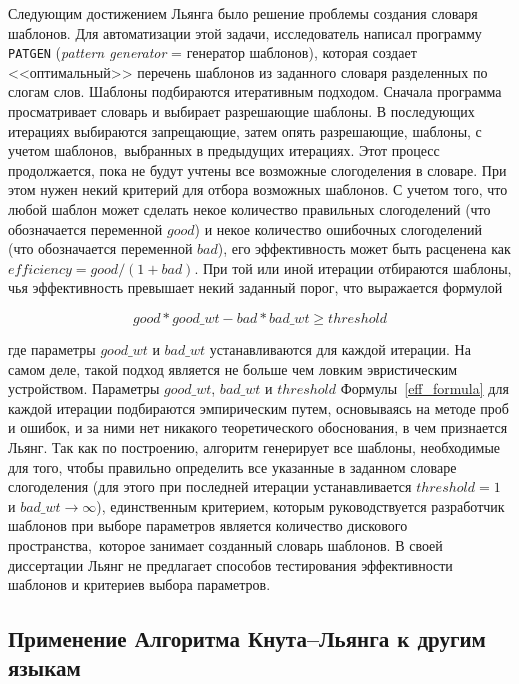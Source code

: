 \documentclass[12pt,a4paper,oneside]{extarticle}
\begin{document}
Следующим достижением Льянга было решение проблемы создания словаря шаблонов. Для автоматизации этой задачи, исследователь написал программу \verb+PATGEN+ (\emph{pattern generator} = генератор шаблонов), которая создает <<оптимальный>> перечень шаблонов из заданного словаря разделенных по слогам слов. Шаблоны подбираются итеративным подходом. Сначала программа просматривает словарь и выбирает разрешающие шаблоны. В последующих итерациях выбираются запрещающие, затем опять разрешающие, шаблоны, с учетом шаблонов, выбранных в предыдущих итерациях. Этот процесс продолжается, пока не будут учтены все возможные слогоделения в словаре. При этом нужен некий критерий для отбора возможных шаблонов. С учетом того, что любой шаблон может сделать некое количество правильных слогоделений (что обозначается переменной $good$) и некое количество ошибочных слогоделений (что обозначается переменной $bad$), его эффективность может быть расценена как $efficiency = good / (1 + bad)$. При той или иной итерации отбираются шаблоны, чья эффективность превышает некий заданный порог, что выражается формулой

\begin{equation}
\label{eff_formula}
good * good\_wt - bad * bad\_wt \geq threshold
\end{equation}

\noindent где параметры $good\_wt$ и $bad\_wt$ устанавливаются для каждой итерации. На самом деле, такой подход является не больше чем 
ловким эвристическим устройством. Параметры $good\_wt$, $bad\_wt$ и $threshold$ Формулы~\ref{eff_formula} для каждой итерации подбираются 
эмпирическим путем, основываясь на методе проб и ошибок, и за ними нет никакого теоретического обоснования, в чем признается 
Льянг\autocite[Ср.: <<We do not have any theoretical justification for these parameters; they just seem to work well>>.][p.~36]{liang1983}. 
Так как по построению, алгоритм генерирует все шаблоны, необходимые для того, чтобы правильно определить все указанные в заданном словаре 
слогоделения (для этого при последней итерации устанавливается $threshold = 1$ и $bad\_wt \rightarrow \infty$), единственным критерием, 
которым руководствуется разработчик шаблонов при выборе параметров является количество дискового пространства, которое занимает созданный 
словарь шаблонов. В своей диссертации Льянг не предлагает способов тестирования эффективности шаблонов и критериев выбора параметров.

\subsection{Применение Алгоритма Кнута--Льянга к другим языкам}
\end{document}

